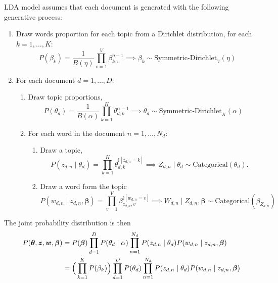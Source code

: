 LDA model assumes that each document is generated with the following generative process:
\begin{enumerate}
  \item Draw words proportion for each topic from a Dirichlet distribution, for each \(k=1,\dots,K\):
    \[
    P(\beta_{k}) = \frac{1}{B(\eta)} \prod_{v=1}^{V}\beta_{k,v}^{\eta - 1} \implies \beta_{k} \sim \text{Symmetric-Dirichlet}_{V}(\eta)
    \]
  \item For each document \(d = 1,\dots,D\):
    \begin{enumerate}
      \item Draw topic proportions,
        \[
        P(\theta_{d}) = \frac{1}{B(\alpha)} \prod_{k=1}^{K}\theta_{d,k}^{\alpha-1} \implies \theta_{d} \sim \text{Symmetric-Dirichlet}_{K}(\alpha)
        \]
      \item For each word in the document \(n = 1,\dots,N_{d}\):
        \begin{enumerate}
          \item Draw  a topic,
            \[
            P(z_{d,n} \mid \theta_{d}) = \prod_{k=1}^{K}\theta_{d,k}^{\mathbb{I}[z_{d,n}=k]} \implies  Z_{d,n} \mid \theta_{d} \sim \text{Categorical}(\theta_d).
            \]
          \item Draw a word form the topic
            \[
            P(w_{d,n}\mid z_{d,n}, \bm{\beta}) = \prod_{v=1}^{V}\beta_{z_{d,n},v}^{\mathbb{I}[w_{d,n}=v]} \implies W_{d,n} \mid Z_{d,n},\bm{\beta} \sim \text{Categorical}(\beta_{Z_{d,n}})
            \]
        \end{enumerate}
    \end{enumerate}
\end{enumerate}

The joint probability distribution is then
\[
  \begin{aligned}
    P(\bm{\theta}, \bm{z}, \bm{w}, \bm{\beta})
    &= P(\bm{\beta})\prod_{d=1}^{D}P(\theta_{d}\mid \alpha)\prod_{n=1}^{N_{d}}P(z_{d,n}\mid \theta_{d})P(w_{d,n} \mid z_{d,n}, \bm{\beta})\\
    &= \Big( \prod_{k=1}^{K}P(\beta_{k}) \Big)\prod_{d=1}^{D}P(\theta_{d})\prod_{n=1}^{N_{d}}P(z_{d,n}\mid \theta_{d})P(w_{d,n} \mid z_{d,n}, \bm{\beta})
  \end{aligned}
\]

